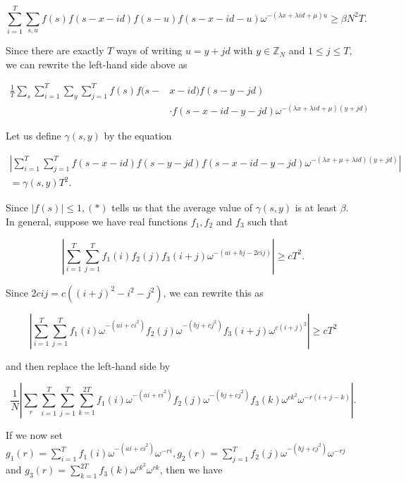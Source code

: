 \documentclass[10pt]{article}
\begin{document}
\begin{equation*}
\sum_{i=1}^{T} \sum_{s, u} f(s) f(s-x-i d) f(s-u) f(s-x-i d-u) \omega^{-(\lambda x+\lambda i d+\mu) u} \geqslant \beta N^{2} T . \tag{*}
\end{equation*}


Since there are exactly $T$ ways of writing $u=y+j d$ with $y \in \mathbb{Z}_{N}$ and $1 \leqslant j \leqslant T$, we can rewrite the left-hand side above as

$$
\begin{aligned}
\frac{1}{T} \sum_{s} \sum_{i=1}^{T} \sum_{y} \sum_{j=1}^{T} f(s) f(s- & x-i d) f(s-y-j d) \\
& \cdot f(s-x-i d-y-j d) \omega^{-(\lambda x+\lambda i d+\mu)(y+j d)}
\end{aligned}
$$

Let us define $\gamma(s, y)$ by the equation

$$
\begin{array}{r}
\left|\sum_{i=1}^{T} \sum_{j=1}^{T} f(s-x-i d) f(s-y-j d) f(s-x-i d-y-j d) \omega^{-(\lambda x+\mu+\lambda i d)(y+j d)}\right| \\
=\gamma(s, y) T^{2} .
\end{array}
$$

Since $|f(s)| \leqslant 1,(*)$ tells us that the average value of $\gamma(s, y)$ is at least $\beta$.\\
In general, suppose we have real functions $f_{1}, f_{2}$ and $f_{3}$ such that

$$
\left|\sum_{i=1}^{T} \sum_{j=1}^{T} f_{1}(i) f_{2}(j) f_{3}(i+j) \omega^{-(a i+b j-2 c i j)}\right| \geqslant c T^{2} .
$$

Since $2 c i j=c\left((i+j)^{2}-i^{2}-j^{2}\right)$, we can rewrite this as

$$
\left|\sum_{i=1}^{T} \sum_{j=1}^{T} f_{1}(i) \omega^{-\left(a i+c i^{2}\right)} f_{2}(j) \omega^{-\left(b j+c j^{2}\right)} f_{3}(i+j) \omega^{c(i+j)^{2}}\right| \geqslant c T^{2}
$$

and then replace the left-hand side by

$$
\frac{1}{N}\left|\sum_{r} \sum_{i=1}^{T} \sum_{j=1}^{T} \sum_{k=1}^{2 T} f_{1}(i) \omega^{-\left(a i+c i^{2}\right)} f_{2}(j) \omega^{-\left(b j+c j^{2}\right)} f_{3}(k) \omega^{c k^{2}} \omega^{-r(i+j-k)}\right| .
$$

If we now set $g_{1}(r)=\sum_{i=1}^{T} f_{1}(i) \omega^{-\left(a i+c i^{2}\right)} \omega^{-r i}, g_{2}(r)=\sum_{j=1}^{T} f_{2}(j) \omega^{-\left(b j+c j^{2}\right)} \omega^{-r j}$ and $g_{3}(r)=\sum_{k=1}^{2 T} f_{3}(k) \omega^{c k^{2}} \omega^{r k}$, then we have
\end{document}
